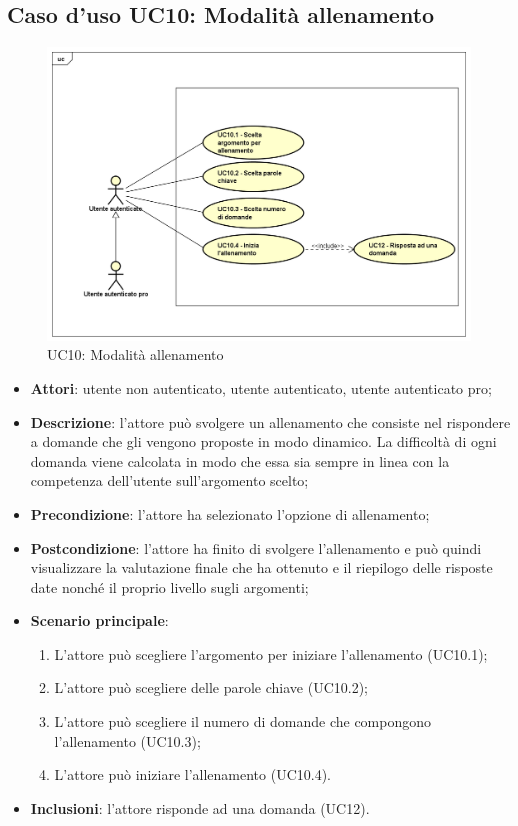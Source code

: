 \newpage
\subsection{Caso d'uso UC10: Modalità allenamento}
\label{UC10}
	\begin{figure}
	\centering
	\includegraphics[scale=0.5]{UML/UC10.png}
	\caption{UC10: Modalità allenamento}
	\end{figure}
\FloatBarrier
\begin{itemize}
\item\textbf{Attori}: utente non autenticato, utente autenticato, utente autenticato pro;
\item\textbf{Descrizione}: l'attore può svolgere un allenamento che consiste nel rispondere a domande che gli vengono proposte in modo dinamico. La difficoltà di ogni domanda viene calcolata in modo che essa sia sempre in linea con la competenza dell'utente sull'argomento scelto;
\item\textbf{Precondizione}: l'attore ha selezionato l'opzione di allenamento;
\item\textbf{Postcondizione}: l'attore ha finito di svolgere l'allenamento e può quindi visualizzare la valutazione finale che ha ottenuto e il riepilogo delle risposte date nonché il proprio livello sugli argomenti;
\item\textbf{Scenario principale}:
	\begin{enumerate}
		\item L'attore può scegliere l'argomento per iniziare l'allenamento (UC10.1);
		\item L'attore può scegliere delle parole chiave (UC10.2);
		\item L'attore può scegliere il numero di domande che compongono l'allenamento (UC10.3);
		\item L'attore può iniziare l'allenamento (UC10.4).
	\end{enumerate}
\item \textbf{Inclusioni}: l'attore risponde ad una domanda (UC12).
\end{itemize}

